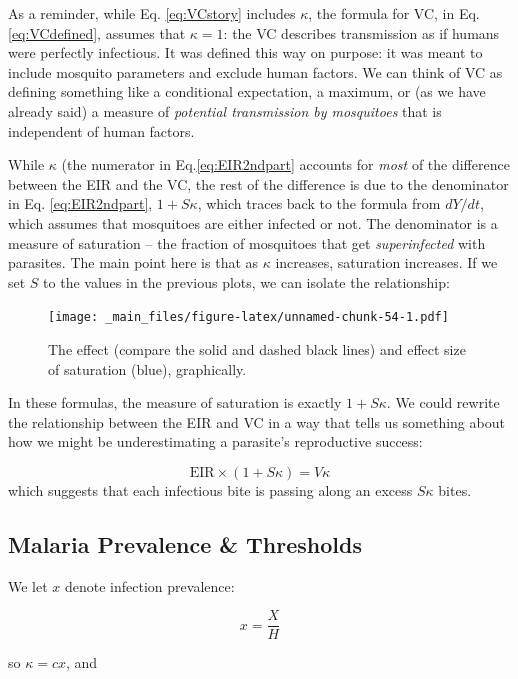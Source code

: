 \documentclass[
]{book}
\begin{document}
As a reminder, while Eq. \eqref{eq:VCstory} includes \(\kappa\), the formula for VC, in Eq. \eqref{eq:VCdefined}, assumes that \(\kappa=1\): the VC describes transmission as if humans were perfectly infectious. It was defined this way on purpose: it was meant to include mosquito parameters and exclude human factors. We can think of VC as defining something like a conditional expectation, a maximum, or (as we have already said) a measure of \emph{potential transmission by mosquitoes} that is independent of human factors.

While \(\kappa\) (the numerator in Eq.\eqref{eq:EIR2ndpart} accounts for \emph{most} of the difference between the EIR and the VC, the rest of the difference is due to the denominator in Eq. \eqref{eq:EIR2ndpart}, \(1+S\kappa\), which traces back to the formula from \(dY/dt\), which assumes that mosquitoes are either infected or not. The denominator is a measure of saturation -- the fraction of mosquitoes that get \emph{superinfected} with parasites. The main point here is that as \(\kappa\) increases, saturation increases. If we set \(S\) to the values in the previous plots, we can isolate the relationship:

\begin{figure}
\centering
\texttt{[image: \_main\_files/figure-latex/unnamed-chunk-54-1.pdf]}
\caption{\label{fig:unnamed-chunk-54}The effect (compare the solid and dashed black lines) and effect size of saturation (blue), graphically.}
\end{figure}

In these formulas, the measure of saturation is exactly \(1+S\kappa\). We could rewrite the relationship between the EIR and VC in a way
that tells us something about how we might be underestimating a parasite's reproductive success:

\[\mbox{EIR}\times (1 + S \kappa) = V \kappa\]
which suggests that each infectious bite is passing along an excess \(S\kappa\) bites.

\subsection{Malaria Prevalence \& Thresholds}\label{malaria-prevalence-thresholds}

We let \(x\) denote infection prevalence:

\begin{equation}
x = \frac{X}{H} 
\end{equation}

so \(\kappa = c x\), and
\end{document}
